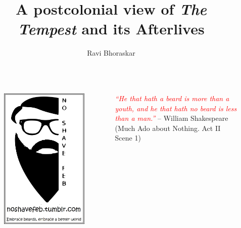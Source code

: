 \documentclass{beamer}
\title[The Tempest \hspace{15em} \insertframenumber / \inserttotalframenumber]{A postcolonial view of \emph{The Tempest} and its Afterlives}
\author {Ravi Bhoraskar}
\begin{document}
\begin{frame}[plain]
  \begin{columns}[c]
    \begin{figure}[htp]
      \begin{center}
        \centering
        \includegraphics[scale=0.17]{nsf.jpg}
      \end{center}
    \end{figure}
    \textcolor{red}{\emph{``He that hath a beard is more than a youth, and he that hath no beard is less than a man.''}}
-- William Shakespeare (Much Ado about Nothing. Act II Scene 1)
  \end{columns}
  
\end{frame}
\end{document}
